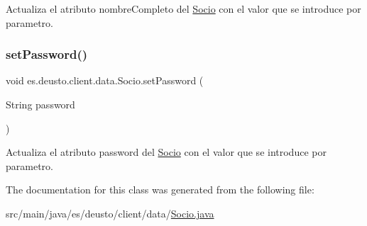 Actualiza el atributo nombre\+Completo del \mbox{\hyperlink{classes_1_1deusto_1_1client_1_1data_1_1_socio}{Socio}} con el valor que se introduce por parametro. \mbox{\label{classes_1_1deusto_1_1client_1_1data_1_1_socio_ae4df4a83361472df8ac0c6a4494be475}} 
\subsubsection{\texorpdfstring{setPassword()}{setPassword()}}
{\footnotesize\ttfamily void es.\+deusto.\+client.\+data.\+Socio.\+set\+Password (\begin{DoxyParamCaption}\item[{String}]{password }\end{DoxyParamCaption})}

Actualiza el atributo password del \mbox{\hyperlink{classes_1_1deusto_1_1client_1_1data_1_1_socio}{Socio}} con el valor que se introduce por parametro. 

The documentation for this class was generated from the following file\+:\begin{DoxyCompactItemize}
\item 
src/main/java/es/deusto/client/data/\mbox{\hyperlink{_socio_8java}{Socio.\+java}}\end{DoxyCompactItemize}
